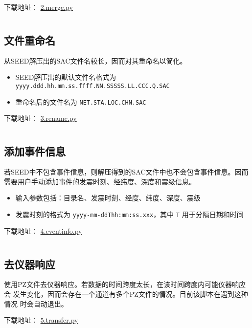 下载地址： \href{https://raw.githubusercontent.com/seisman/SAC_Docs_zh/master/call-in-script/2.merge.py}{2.merge.py}
\inputminted{python}{./call-in-script/2.merge.py}

\subsection{文件重命名}
\label{subsec:rename-in-python}
从SEED解压出的SAC文件名较长，因而对其重命名以简化。
\begin{itemize}
\item SEED解压出的默认文件名格式为 \texttt{yyyy.ddd.hh.mm.ss.ffff.NN.SSSSS.LL.CCC.Q.SAC}
\item 重命名后的文件名为 \texttt{NET.STA.LOC.CHN.SAC}
\end{itemize}

下载地址： \href{https://raw.githubusercontent.com/seisman/SAC_Docs_zh/master/call-in-script/3.rename.py}{3.rename.py}
\inputminted{python}{./call-in-script/3.rename.py}

\subsection{添加事件信息}
\label{subsec:event-info-python}
若SEED中不包含事件信息，则解压得到的SAC文件中也不会包含事件信息。因而
需要用户手动添加事件的发震时刻、经纬度、深度和震级信息。
\begin{itemize}
\item 输入参数包括：目录名、发震时刻、经度、纬度、深度、震级
\item 发震时刻的格式为 \texttt{yyyy-mm-ddThh:mm:ss.xxx}，其中 \texttt{T}
    用于分隔日期和时间
\end{itemize}

下载地址： \href{https://raw.githubusercontent.com/seisman/SAC_Docs_zh/master/call-in-script/4.eventinfo.py}{4.eventinfo.py}
\inputminted{python}{./call-in-script/4.eventinfo.py}

\subsection{去仪器响应}
\label{subsec:transfer-python}
使用PZ文件去仪器响应。若数据的时间跨度太长，在该时间跨度内可能仪器响应会
发生变化，因而会存在一个通道有多个PZ文件的情况。目前该脚本在遇到这种情况
时会自动退出。

下载地址： \href{https://raw.githubusercontent.com/seisman/SAC_Docs_zh/master/call-in-script/5.transfer.py}{5.transfer.py}
\inputminted{python}{./call-in-script/5.transfer.py}

